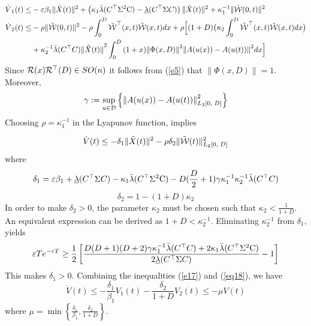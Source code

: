\documentclass[12pt,draftcls,onecolumn]{IEEEtran}
\begin{document}
\begin{align*}
{{\dot V}_1}(t) \le & - \varepsilon {\beta _1}{\| {\tilde X(t)} \|^2} + \left( {{\kappa _1}\bar\lambda ({C^{\top} }{{\rm{\Sigma }}^2}{\rm{C}}) - \underline\lambda ({C^{\top} }{\rm{\Sigma }}C)} \right){\| {\tilde X(t)} \|^2} + \kappa _1^{ - 1}{\| {\tilde {\cal W}(0,t)} \|^2}\\
{{\dot V}_2}(t) \le & - \rho {\| {\tilde {\cal W}(0,t)} \|^2} - \rho \int_0^D {{{\tilde {\cal W}}^{\top} }(x,t)\tilde {\cal W}(x,t)dx} + \rho  \Big[ {(1 + D)\big( {{\kappa _2}\int_0^D {{{\tilde {\cal W}}^{\top} }(x,t)\tilde {\cal W}(x,t)dx} } \big)  } \\
& +  {\kappa _2^{ - 1}\bar \lambda ({C^{\top} }C) \| {\tilde X(t)} \|}^2 \int_0^D {(1 + x){{\| {\Phi (x,D)} \|}^2}} {{\| {A(u(x)) - A(u(t))} \|}^2}dx  \Big ]
\end{align*}
Since $ {\cal R}(x){{\cal R}^\top}(D) \in SO(n) $ it follows from (\ref{e5}) that $ \| {\Phi (x,D)} \| = 1 $. Moreover,
\begin{equation}
\gamma  := \mathop {\sup }\limits_{u \in {\cal D}} \left\{ {\left\| {A(u(x)) - A(u(t))} \right\|_{{L_2}\left[ {0,\;D} \right]}^2} \right\}
\label{eq:gamma}
\end{equation}
Choosing $ \rho  = \kappa _1^{ - 1} $  in the Lyapunov function, implies

\begin{equation} \label{eq18}
\dot V(t) \le  - {\delta _1}{\| {\tilde X(t)} \|^2} - \rho {\delta _2}\| {\tilde {\cal W}(t)} \|_{{L_2}\left[ {0,\;D} \right]}^2
\end{equation}
where
\[{\delta _1} = \varepsilon {\beta _1} + \underline\lambda {({C^{\top} }{\rm{\Sigma }}C)} - {\kappa _1}\bar\lambda ({C^{\top} }{{\rm{\Sigma }}^2}{\rm{C}}) - D(\frac{D}{2} + 1)\gamma \kappa _1^{ - 1}\kappa _2^{ - 1}\bar\lambda ({C^{\top} }C)\]
\[{\delta _2} = 1 - (1 + D){\kappa _2}\]
In order to make $ {\delta _2} > 0 $, the parameter $ {\kappa _2} $ must be chosen such that $ {\kappa _2} < \frac{1}{{1 + D}} $. An equivalent expression can be derived as $ 1 + D < \kappa _2^{ - 1} $. Eliminating $\kappa _2^{ - 1} $ from $ {\delta _1} $, yields
\begin{equation} \label{epsilon}
\varepsilon T{e^{ - \varepsilon T}} \ge \frac{1}{2}\left[ {\frac{{D(D + 1)(D + 2)\gamma \kappa _1^{ - 1}\bar\lambda ({C^{\top} }C) + 2{\kappa _1}\bar\lambda ({C^{\top} }{{\rm{\Sigma }}^2}{\rm{C}})}}{{2\underline\lambda ({C^{\top} }{\rm{\Sigma }}C)}} - 1} \right]
\end{equation}
This makes ${\delta _1} > 0 $.
Combining the inequalities (\ref{e17}) and (\ref{eq18}), we have
\[\dot V(t) \le  - \frac{{{\delta _1}}}{{{\beta _1}}}{V_1}(t) - \frac{{{\delta _2}}}{{1 + D}}{V_2}(t) \le  - \mu V(t)\]
where $ \mu  = \min \left\{ {\frac{{{\delta _1}}}{{{\beta _1}}},\frac{{{\delta _2}}}{{1 + D}}} \right\} $.
\end{document}
